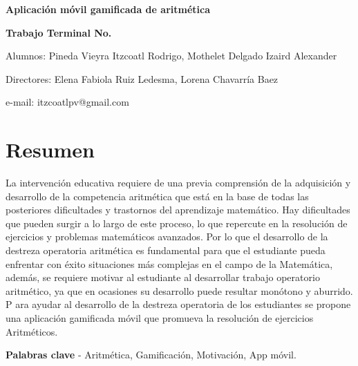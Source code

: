 \documentclass{article}
\begin{document}
\begin{center}
	\begin{Large}
		\textbf{Aplicación móvil gamificada de aritmética}
	\end{Large}

	\textbf{Trabajo Terminal No.}

	Alumnos: Pineda Vieyra Itzcoatl Rodrigo, Mothelet Delgado Izaird Alexander

	Directores: Elena Fabiola Ruiz Ledesma, Lorena Chavarría Baez

	e-mail: itzcoatlpv@gmail.com
\end{center}

\section*{Resumen}
La intervención educativa requiere de una previa comprensión de la adquisición
y desarrollo de la competencia aritmética que está en la base de todas las 
posteriores dificultades y trastornos del aprendizaje matemático. Hay dificultades 
que pueden surgir a lo largo de este proceso, lo que repercute en la resolución de 
ejercicios y problemas matemáticos avanzados. Por lo que el desarrollo de la destreza 
operatoria aritmética es fundamental para que el estudiante pueda enfrentar con éxito  
situaciones más complejas en el campo de la Matemática, además, se requiere motivar al 
estudiante  al desarrollar trabajo operatorio aritmético, ya que en ocasiones su desarrollo 
puede resultar monótono y aburrido. P ara ayudar al desarrollo de la destreza operatoria 
de los estudiantes se propone una aplicación gamificada móvil que promueva la resolución 
de ejercicios Aritméticos.

\textbf{Palabras clave} - Aritmética, Gamificación, Motivación, App móvil.
\end{document}
